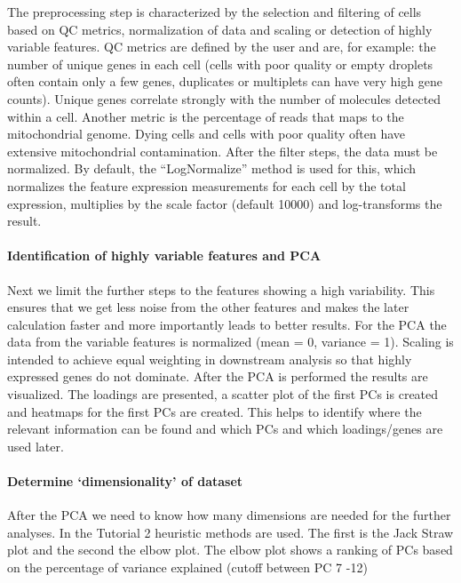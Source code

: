 The preprocessing step is characterized by the selection and filtering
of cells based on QC metrics, normalization of data and scaling or
detection of highly variable features. QC metrics are defined by the
user and are, for example: the number of unique genes in each cell
(cells with poor quality or empty droplets often contain only a few
genes, duplicates or multiplets can have very high gene counts). Unique
genes correlate strongly with the number of molecules detected within a
cell. Another metric is the percentage of reads that maps to the
mitochondrial genome. Dying cells and cells with poor quality often have
extensive mitochondrial contamination. After the filter steps, the data
must be normalized. By default, the ``LogNormalize'' method is used for
this, which normalizes the feature expression measurements for each cell
by the total expression, multiplies by the scale factor (default 10000)
and log-transforms the result.

\hypertarget{identification-of-highly-variable-features-and-pca}{%
\paragraph{Identification of highly variable features and
PCA}\label{identification-of-highly-variable-features-and-pca}}

Next we limit the further steps to the features showing a high
variability. This ensures that we get less noise from the other features
and makes the later calculation faster and more importantly leads to
better results. For the PCA the data from the variable features is
normalized (mean = 0, variance = 1). Scaling is intended to achieve
equal weighting in downstream analysis so that highly expressed genes do
not dominate. After the PCA is performed the results are visualized. The
loadings are presented, a scatter plot of the first PCs is created and
heatmaps for the first PCs are created. This helps to identify where the
relevant information can be found and which PCs and which loadings/genes
are used later.

\hypertarget{determine-dimensionality-of-dataset}{%
\paragraph{Determine `dimensionality' of
dataset}\label{determine-dimensionality-of-dataset}}

After the PCA we need to know how many dimensions are needed for the
further analyses. In the Tutorial 2 heuristic methods are used. The
first is the Jack Straw plot and the second the elbow plot. The elbow
plot shows a ranking of PCs based on the percentage of variance
explained (cutoff between PC 7 -12)


